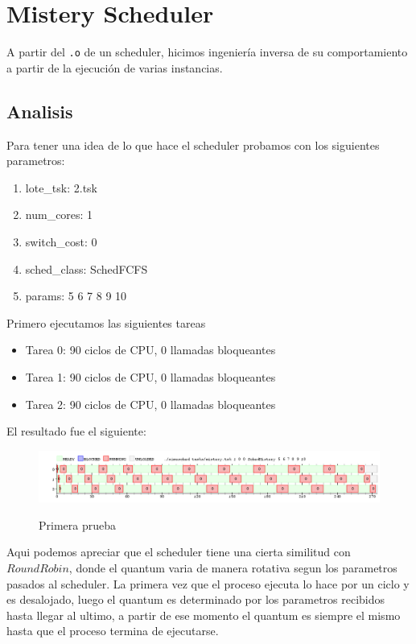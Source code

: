 \section{Mistery Scheduler}

A partir del \texttt{.o} de un scheduler, hicimos ingeniería inversa de su comportamiento a partir de la ejecución de varias instancias.

\subsection{Analisis}

Para tener una idea de lo que hace el scheduler probamos con los siguientes parametros:

\begin{enumerate}
	\item lote\_tsk: 2.tsk
	\item num\_cores: 1
	\item switch\_cost: 0
	\item sched\_class: SchedFCFS
	\item params: 5 6 7 8 9 10
\end{enumerate}

Primero ejecutamos las siguientes tareas

\begin{itemize}
	\item Tarea 0: 90 ciclos de CPU, 0 llamadas bloqueantes
	\item Tarea 1: 90 ciclos de CPU, 0 llamadas bloqueantes
	\item Tarea 2: 90 ciclos de CPU, 0 llamadas bloqueantes
\end{itemize}

El resultado fue el siguiente:

\begin{figure}[h]
    \includegraphics[width=\linewidth]{images/mist.png}
    \label{fig:Task Consola}
    \caption{Primera prueba}
\end{figure}

Aqui podemos apreciar que el scheduler tiene una cierta similitud con $Round Robin$, donde el quantum varia de manera rotativa segun los parametros pasados al scheduler. La primera vez que el proceso ejecuta lo hace por un ciclo y es desalojado, luego el quantum es determinado por los parametros recibidos hasta llegar al ultimo, a partir de ese momento el quantum es siempre el mismo hasta que el proceso termina de ejecutarse.

